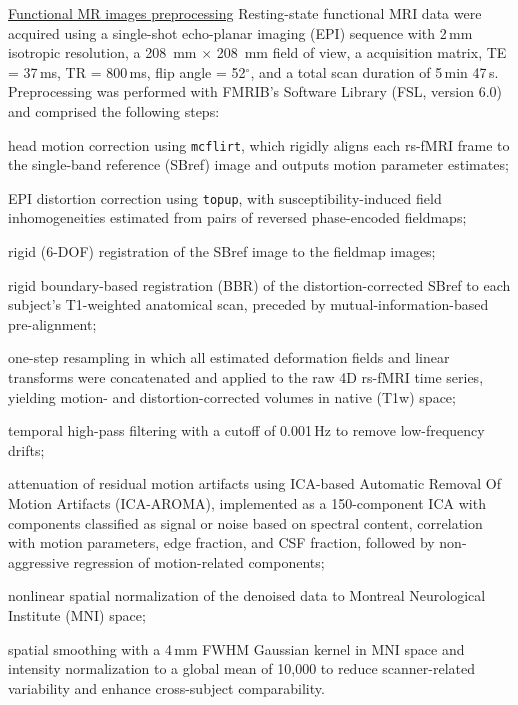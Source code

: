 \noindent\underline{Functional MR images preprocessing}
Resting-state functional MRI data were acquired using a single-shot echo-planar imaging (EPI) sequence with 2\,mm isotropic resolution, a \SI{208}{\milli\meter} \(\times\) \SI{208}{\milli\meter} field of view, a  acquisition matrix, TE = 37\,ms, TR = 800\,ms, flip angle = 52$^{\circ}$, and a total scan duration of 5\,min 47\,s.
Preprocessing was performed with FMRIB's Software Library (FSL, version 6.0\cite{smithAdvancesFunctionalStructural2004,jenkinsonFSL2012}) and comprised the following steps: 
\begin{inparaenum}[(i)]
    \item head motion correction using \texttt{mcflirt}\cite{jenkinsonImprovedOptimizationRobust2002}, which rigidly aligns each rs-fMRI frame to the single-band reference (SBref) image and outputs motion parameter estimates; 
    \item EPI distortion correction using \texttt{topup}\cite{anderssonHowCorrectSusceptibility2003,smithAdvancesFunctionalStructural2004}, with susceptibility-induced field inhomogeneities estimated from pairs of reversed phase-encoded fieldmaps; 
    \item rigid (6-DOF) registration of the SBref image to the fieldmap images; 
    \item rigid boundary-based registration (BBR)\cite{greveAccurateRobustBrain2009} of the distortion-corrected SBref to each subject’s T1-weighted anatomical scan, preceded by mutual-information-based pre-alignment; 
    \item one-step resampling in which all estimated deformation fields and linear transforms were concatenated and applied to the raw 4D rs-fMRI time series, yielding motion- and distortion-corrected volumes in native (T1w) space\cite{glasserMultimodalParcellationHuman2016}; 
    \item temporal high-pass filtering with a cutoff of 0.001\,Hz to remove low-frequency drifts; 
    \item attenuation of residual motion artifacts using ICA-based Automatic Removal Of Motion Artifacts (ICA-AROMA)\cite{pruimICAAROMARobustICAbased2015, parkesEvaluationEfficacyReliability2018}, implemented as a 150-component ICA with components classified as signal or noise based on spectral content, correlation with motion parameters, edge fraction, and CSF fraction, followed by non-aggressive regression of motion-related components; 
    \item nonlinear spatial normalization of the denoised data to Montreal Neurological Institute (MNI) space\cite{fonovUnbiasedNonlinearAverage2009,fonovUnbiasedAverageAgeappropriate2011}; 
    \item spatial smoothing with a 4\,mm FWHM Gaussian kernel in MNI space and intensity normalization to a global mean of 10{,}000\cite{glasserMinimalPreprocessingPipelines2013} to reduce scanner-related variability and enhance cross-subject comparability.
\end{inparaenum}

